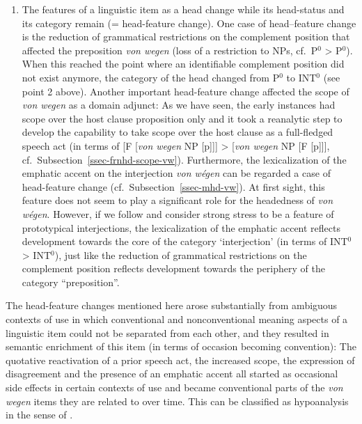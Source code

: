 \documentclass[output=paper
  ,nobabel
  ,draftmode
  ,babelshorthands
  ,colorlinks, citecolor=brown
]{langscibook}
\begin{document}
\begin{enumerate}
\largerpage
    \item The features of a linguistic item as a head change while its head-status and its category remain (= head-feature change). One case of head--feature change is the reduction of grammatical restrictions on the complement position that affected the preposition \emph{von wegen} (loss of a restriction to NPs, cf.\ P$^0$ > P$^0$). When this reached the point where an identifiable complement position did not exist anymore, the category of the head changed from P$^0$ to INT$^0$ (see point 2 above). Another important head-feature change affected the scope of \emph{von wegen} as a domain adjunct: As we have seen, the early instances had scope over the host clause proposition only and it took a reanalytic step to develop the capability to take scope over the host clause as a full-fledged speech act (in terms of [F [\emph{von wegen} NP [p]]] > [\emph{von wegen} NP [F [p]]], cf.\ Subsection~\ref{ssec-frnhd-scope-vw}). Furthermore, the lexicalization of the emphatic accent on the interjection \emph{von wégen} can be regarded a case of head-feature change (cf.\ Subsection~\ref{ssec-mhd-vw}). At first sight, this feature does not seem to play a significant role for the headedness of \emph{von wégen}. However, if we follow \citet[18]{Nuebling2004} and consider strong stress to be a feature of prototypical interjections, the lexicalization of the emphatic accent reflects development towards the core of the category `interjection' (in terms of INT$^0$ > INT$^0$), just like the reduction of grammatical restrictions on the complement position reflects development towards the periphery of the category “preposition”.
\end{enumerate}

\largerpage
\noindent
The head-feature changes mentioned here arose substantially from ambiguous contexts of use in which
conventional and nonconventional meaning aspects of a linguistic item could not be separated from
each other, and they resulted in semantic enrichment of this item (in terms of occasion becoming
convention): The quotative reactivation of a prior speech act, the increased scope, the expression
of disagreement and the presence of an emphatic accent all started as occasional side effects in
certain contexts of use and became conventional parts of the \emph{von wegen} items they are related
to over time. This can be classified as hypoanalysis in the sense of
\citet[126–130]{Croft2000}.%
\end{document}
